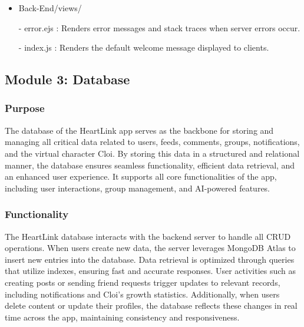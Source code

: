 \begin{itemize}
                    \item Back-End/views/
                        \item[-] error.ejs : Renders error messages and stack traces when server errors occur.
                        \item[-] index.js : Renders the default welcome message displayed to clients.
                \end{itemize}
        
    \subsection{Module 3: Database}
        \subsubsection{Purpose}
            The database of the HeartLink app serves as the backbone for storing and managing all critical data related to users, feeds, comments, groups, notifications, and the virtual character Cloi. By storing this data in a structured and relational manner, the database ensures seamless functionality, efficient data retrieval, and an enhanced user experience. It supports all core functionalities of the app, including user interactions, group management, and AI-powered features.\\
            \vspace{3mm}
        \subsubsection{Functionality}
            The HeartLink database interacts with the backend server to handle all CRUD operations. When users create new data, the server leverages MongoDB Atlas to insert new entries into the database. Data retrieval is optimized through queries that utilize indexes, ensuring fast and accurate responses. User activities such as creating posts or sending friend requests trigger updates to relevant records, including notifications and Cloi's growth statistics. Additionally, when users delete content or update their profiles, the database reflects these changes in real time across the app, maintaining consistency and responsiveness.\\
            \vspace{3mm}

